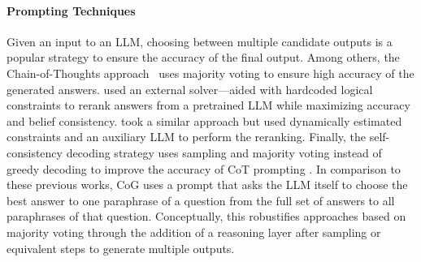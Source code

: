 \paragraph{Prompting Techniques}
Given an input to an LLM, choosing between multiple candidate outputs is a popular strategy to ensure the accuracy of the final output. Among others, the Chain-of-Thoughts approach~\citep[CoT]{wei2023chainofthought} uses majority voting to ensure high accuracy of the generated answers. \citet{kassner_beliefbank_2021} used an external solver---aided with hardcoded logical constraints to rerank answers from a pretrained LLM while maximizing accuracy and belief consistency. \citet{mitchell-etal-2022-enhancing} took a similar approach but used dynamically estimated constraints and an auxiliary LLM to perform the reranking. Finally, the self-consistency decoding strategy uses sampling and majority voting instead of greedy decoding to improve the accuracy of CoT prompting \citep{wang_self-consistency_2022,aggarwal2023lets}. In comparison to these previous works, CoG uses a prompt that asks the LLM itself to choose the best answer to one paraphrase of a question from the full set of answers to all paraphrases of that question. Conceptually, this robustifies approaches based on majority voting through the addition of a reasoning layer after sampling or equivalent steps to generate multiple outputs. 


